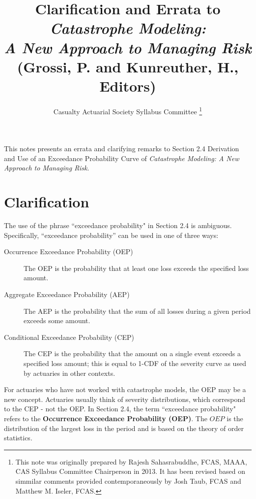 \documentclass[]{article}
\title{Clarification and Errata to \\\textit{Catastrophe Modeling: \\A New Approach to Managing Risk} \\(Grossi, P. and Kunreuther, H., Editors)}
\author{Casualty Actuarial Society Syllabus Committee \thanks{This note was originally prepared by Rajesh Sahasrabuddhe, FCAS, MAAA, CAS Syllabus Committee Chairperson in 2013. It has been revised based on simmilar comments provided contemporaneously by Josh Taub, FCAS and Matthew M. Iseler, FCAS.} } %
\begin{document}
\maketitle

\begin{abstract}

\end{abstract}
This notes presents an errata and clarifying remarks to Section 2.4 Derivation and Use of an Exceedance Probability Curve of \textit{Catastrophe Modeling: A New Approach to Managing Risk}.
\section{Clarification}
The use of the phrase ``exceedance probability" in Section 2.4 is ambiguous.  Specifically, “exceedance probability” can be used in one of three ways:
\begin{description}
\item[Occurrence Exceedance Probability (OEP)] The OEP is the probability that at least one loss exceeds the specified loss amount.
\item[Aggregate Exceedance Probability (AEP)] The AEP is the probability that the sum of all losses during a given period exceeds some amount.
\item[Conditional Exceedance Probability (CEP)] The CEP is the probability that the amount on a single event exceeds a specified loss amount; this is equal to 1-CDF of the severity curve as used by actuaries in other contexts.
\end{description}

For actuaries who have not worked with catastrophe models, the OEP may be a new concept.  Actuaries usually think of severity distributions, which correspond to the CEP - not the OEP.  In Section 2.4, the term ``exceedance probability" refers to the \textbf{Occurrence Exceedance Probability (OEP)}. The $OEP$ is the distribution of the largest loss in the period and is based on the theory of order statistics.
\end{document}
